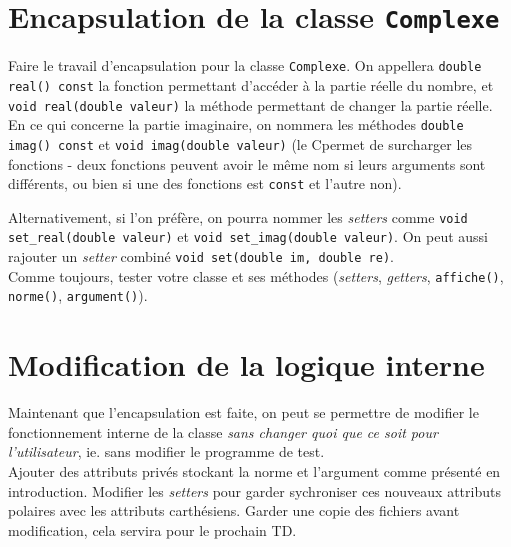 \documentclass{book}
\newcommand{\inline}[1]{\texttt{#1}}
\newcommand{\cpp}{\mbox{C\vspace{.5em}\protect\raisebox{.2ex}{\footnotesize++~}}}
\begin{document}
\section{Encapsulation de la classe \texttt{Complexe}}

Faire le travail d'encapsulation pour la classe \inline{Complexe}. On appellera \inline{double real() const} la fonction permettant d'accéder à la partie réelle du nombre, et \inline{void real(double valeur)} la méthode permettant de changer la partie réelle. En ce qui concerne la partie imaginaire, on nommera les méthodes \inline{double imag() const} et \inline{void imag(double valeur)} (le \cpp permet de surcharger les fonctions - deux fonctions peuvent avoir le même nom si leurs arguments sont différents, ou bien si une des fonctions est \inline{const} et l'autre non).

Alternativement, si l'on préfère, on pourra nommer les \textit{setters} comme \inline{void set_real(double valeur)} et \inline{void set_imag(double valeur)}. On peut aussi rajouter un \textit{setter} combiné \inline{void set(double im, double re)}.\\

Comme toujours, tester votre classe et ses méthodes (\textit{setters}, \textit{getters}, \inline{affiche()}, \inline{norme()}, \inline{argument()}).

\section{Modification de la logique interne}

Maintenant que l'encapsulation est faite, on peut se permettre de modifier le fonctionnement interne de la classe \emph{sans changer quoi que ce soit pour l'utilisateur}, ie. sans modifier le programme de test.\\

Ajouter des attributs privés stockant la norme et l'argument comme présenté en introduction. Modifier les \textit{setters} pour garder sychroniser ces nouveaux attributs polaires avec les attributs carthésiens. Garder une copie des fichiers avant modification, cela servira pour le prochain TD.
\end{document}
